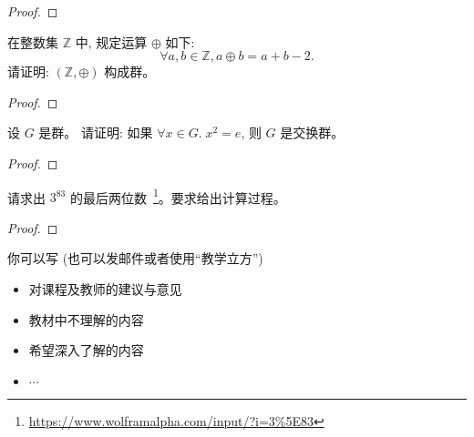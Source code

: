 \documentclass[a4paper, justified]{tufte-handout}
\begin{document}
\begin{proof}
\end{proof}

\begin{problem}
  在整数集 $\mathbb{Z}$ 中, 规定运算 $\oplus$ 如下:
  \[
    \forall a, b \in \mathbb{Z}, a \oplus b = a + b - 2.
  \]
  请证明: $(\mathbb{Z}, \oplus)$ 构成群。
\end{problem}

\begin{proof}
\end{proof}

\begin{problem}
  设 $G$ 是群。
  请证明: 如果 $\forall x \in G.\; x^2 = e$,
  则 $G$ 是交换群。
\end{problem}

\begin{proof}
\end{proof}

\begin{problem}
  请求出 $3^{83}$ 的最后两位数~\footnote{\url{https://www.wolframalpha.com/input/?i=3\%5E83}}。要求给出计算过程。
\end{problem}

\begin{proof}
\end{proof}

\begincorrection

\beginfb

你可以写 (也可以发邮件或者使用``教学立方'')
\begin{itemize}
  \item 对课程及教师的建议与意见
  \item 教材中不理解的内容
  \item 希望深入了解的内容
  \item $\cdots$
\end{itemize}
\end{document}

